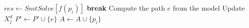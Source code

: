 	\STATE $res \gets SmtSolve\left[
	 f(p_i) 
	\right]$
		\STATE \textbf{break}
	\ENDIF
	\STATE Compute the path $e$ from the model
	\STATE Update $X^d_j$
	\STATE $P' \gets P' \cup \{e\}$
	\STATE $A \gets A \cup \{p_i\}$
\ENDWHILE
